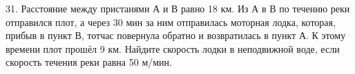 31. Расстояние между пристанями А и В равно 18 км. Из А в В по течению реки отправился плот, а через 30 мин за ним отправилась моторная лодка, которая, прибыв в пункт В, тотчас повернула обратно и возвратилась в пункт А. К этому времени плот прошёл 9 км. Найдите скорость лодки в неподвижной воде, если скорость течения реки равна 50 м/мин.\\
